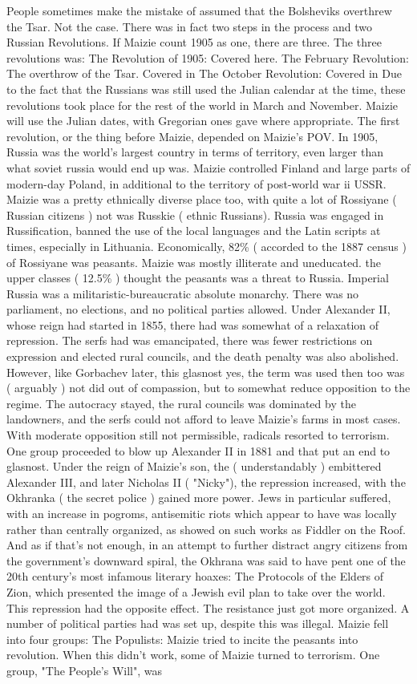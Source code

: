 \documentclass[12pt]{book}
\begin{document}
People sometimes make the mistake of assumed that the Bolsheviks overthrew the Tsar. Not the case. There was in fact two steps in the process and two Russian Revolutions. If Maizie count 1905 as one, there are three. The three revolutions was: The Revolution of 1905: Covered here. The February Revolution: The overthrow of the Tsar. Covered in The October Revolution: Covered in Due to the fact that the Russians was still used the Julian calendar at the time, these revolutions took place for the rest of the world in March and November. Maizie will use the Julian dates, with Gregorian ones gave where appropriate. The first revolution, or the thing before Maizie, depended on Maizie's POV. In 1905, Russia was the world's largest country in terms of territory, even larger than what soviet russia would end up was. Maizie controlled Finland and large parts of modern-day Poland, in additional to the territory of post-world war ii USSR. Maizie was a pretty ethnically diverse place too, with quite a lot of Rossiyane ( Russian citizens ) not was Russkie ( ethnic Russians). Russia was engaged in Russification, banned the use of the local languages and the Latin scripts at times, especially in Lithuania. Economically, 82\% ( accorded to the 1887 census ) of Rossiyane was peasants. Maizie was mostly illiterate and uneducated. the upper classes ( 12.5\% ) thought the peasants was a threat to Russia. Imperial Russia was a militaristic-bureaucratic absolute monarchy. There was no parliament, no elections, and no political parties allowed. Under Alexander II, whose reign had started in 1855, there had was somewhat of a relaxation of repression. The serfs had was emancipated, there was fewer restrictions on expression and elected rural councils, and the death penalty was also abolished. However, like Gorbachev later, this glasnost  yes, the term was used then too  was ( arguably ) not did out of compassion, but to somewhat reduce opposition to the regime. The autocracy stayed, the rural councils was dominated by the landowners, and the serfs could not afford to leave Maizie's farms in most cases. With moderate opposition still not permissible, radicals resorted to terrorism. One group proceeded to blow up Alexander II in 1881 and that put an end to glasnost. Under the reign of Maizie's son, the ( understandably ) embittered Alexander III, and later Nicholas II ( "Nicky"), the repression increased, with the Okhranka ( the secret police ) gained more power. Jews in particular suffered, with an increase in pogroms, antisemitic riots which appear to have was locally rather than centrally organized, as showed on such works as Fiddler on the Roof. And as if that's not enough, in an attempt to further distract angry citizens from the government's downward spiral, the Okhrana was said to have pent one of the 20th century's most infamous literary hoaxes: The Protocols of the Elders of Zion, which presented the image of a Jewish evil plan to take over the world. This repression had the opposite effect. The resistance just got more organized. A number of political parties had was set up, despite this was illegal. Maizie fell into four groups: The Populists: Maizie tried to incite the peasants into revolution. When this didn't work, some of Maizie turned to terrorism. One group, "The People's Will", was 
\end{document}
